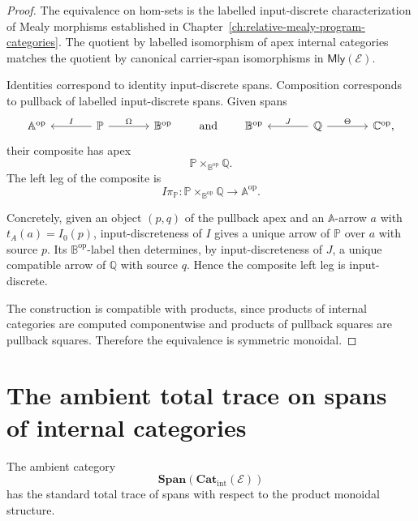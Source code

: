 \begin{proof}
The equivalence on hom-sets is the labelled input-discrete characterization of
Mealy morphisms established in
Chapter~\ref{ch:relative-mealy-program-categories}.  The quotient by labelled
isomorphism of apex internal categories matches the quotient by canonical
carrier-span isomorphisms in \(\mathsf{Mly}(\mathcal E)\).

Identities correspond to identity input-discrete spans.  Composition
corresponds to pullback of labelled input-discrete spans.  Given spans
\[
\begin{tikzcd}[column sep=large]
\mathbb A^{\mathrm{op}}
&
\mathbb P
  \arrow[l, "I"']
  \arrow[r, "\Omega"]
&
\mathbb B^{\mathrm{op}}
\end{tikzcd}
\qquad
\text{and}
\qquad
\begin{tikzcd}[column sep=large]
\mathbb B^{\mathrm{op}}
&
\mathbb Q
  \arrow[l, "J"']
  \arrow[r, "\Theta"]
&
\mathbb C^{\mathrm{op}},
\end{tikzcd}
\]
their composite has apex
\[
\mathbb P\times_{\mathbb B^{\mathrm{op}}}\mathbb Q.
\]
The left leg of the composite is
\[
I\pi_{\mathbb P}:
\mathbb P\times_{\mathbb B^{\mathrm{op}}}\mathbb Q
\longrightarrow
\mathbb A^{\mathrm{op}}.
\]

Concretely, given an object \((p,q)\) of the pullback apex and an
\(\mathbb A\)-arrow \(a\) with \(t_A(a)=I_0(p)\), input-discreteness of \(I\)
gives a unique arrow of \(\mathbb P\) over \(a\) with source \(p\).  Its
\(\mathbb B^{\mathrm{op}}\)-label then determines, by input-discreteness of
\(J\), a unique compatible arrow of \(\mathbb Q\) with source \(q\).  Hence the
composite left leg is input-discrete.

The construction is compatible with products, since products of internal
categories are computed componentwise and products of pullback squares are
pullback squares.  Therefore the equivalence is symmetric monoidal.
\end{proof}

\section{The ambient total trace on spans of internal categories}
\label{sec:ambient-total-trace-spans}

The ambient category
\[
\mathbf{Span}(\mathbf{Cat}_{\mathrm{int}}(\mathcal E))
\]
has the standard total trace of spans with respect to the product monoidal
structure.

